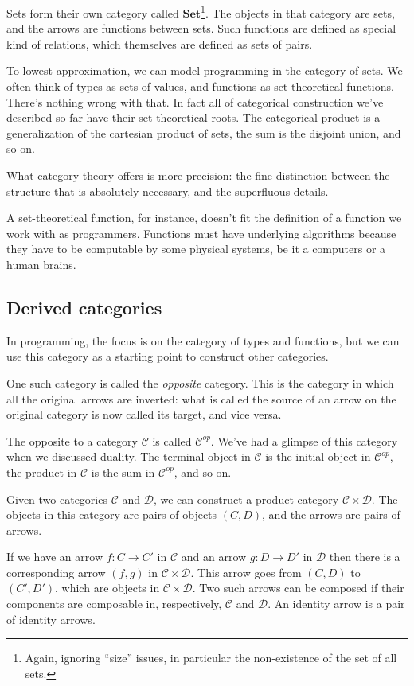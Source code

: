 \documentclass[DaoFP]{subfiles}
\begin{document}
Sets form their own category called $\mathbf{Set}$\footnote{Again, ignoring ``size'' issues, in particular the non-existence of the set of all sets.}. The objects in that category are sets, and the arrows are functions between sets. Such functions are defined as special kind of relations, which themselves are defined as sets of pairs.

To lowest approximation, we can model programming in the category of sets. We often think of types as sets of values, and functions as set-theoretical functions. There's nothing wrong with that. In fact all of categorical construction we've described so far have their set-theoretical roots. The categorical product is a generalization of the cartesian product of sets, the sum is the disjoint union, and so on. 

What category theory offers is more precision: the fine distinction between the structure that is absolutely necessary, and the superfluous details. 

A set-theoretical function, for instance, doesn't fit the definition of a function we work with as programmers. Functions must have underlying algorithms because they have to be computable by some physical systems, be it a computers or a human brains. 

\subsection{Derived categories}
In programming, the focus is on the category of types and functions, but we can use this category as a starting point to construct other categories. 
 
One such category is called the \emph{opposite} category. This is the category in which all the original arrows are inverted: what is called the source of an arrow on the original category is now called its target, and vice versa. 

The opposite to a category $\mathcal{C}$ is called $\mathcal{C}^{op}$. We've had a glimpse of this category when we discussed duality. The terminal object in  $\mathcal{C}$ is the initial object in $\mathcal{C}^{op}$, the product in  $\mathcal{C}$ is the sum in $\mathcal{C}^{op}$, and so on. 

Given two categories $\mathcal{C}$ and $\mathcal{D}$, we can construct a product category $\mathcal{C} \times \mathcal{D}$. The objects in this category are pairs of objects $(C, D)$, and the arrows are pairs of arrows. 

If we have an arrow $f \colon C \to C'$ in $\mathcal{C}$ and an arrow $g \colon D \to D'$ in $\mathcal{D}$ then there is a corresponding arrow $(f, g)$ in $\mathcal{C} \times \mathcal{D}$.  This arrow goes from $(C, D)$ to $(C', D')$, which are objects in $\mathcal{C} \times \mathcal{D}$. Two such arrows can be composed if their components are composable in, respectively, $\mathcal{C}$ and $\mathcal{D}$. An identity arrow is a pair of identity arrows.
\end{document}
